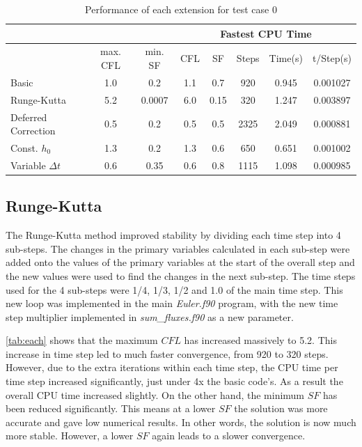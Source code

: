 \documentclass[12pt, a4paper]{article}
\begin{document}
\begin{table}[htbp]
	\centering
	\caption{Performance of each extension for test case 0}
	\begin{tabular}{|l|c|c||c|c|c|c|c|} \hline
		&       &       & \multicolumn{5}{c|}{Fastest CPU Time} \\ \hline
		& max. CFL & min. SF & CFL   & SF    & Steps & Time(s) & t/Step(s) \\ \hline
		Basic & 1.0     & 0.2   & 1.1   & 0.7   & 920   & 0.945 & 0.001027 \\ \hline
		Runge-Kutta & 5.2   & 0.0007 & 6.0     & 0.15  & 320   & 1.247 & 0.003897 \\ \hline
		Deferred Correction & 0.5   & 0.2   & 0.5   & 0.5   & 2325  & 2.049 & 0.000881 \\ \hline
		Const. $h_0$ & 1.3   & 0.2   & 1.3   & 0.6   & 650   & 0.651 & 0.001002 \\ \hline
		Variable $\Delta t$ & 0.6   & 0.35  & 0.6   & 0.8   & 1115  & 1.098 & 0.000985 \\ \hline
	\end{tabular}%
	\label{tab:each}%
\end{table}%

\subsection{Runge-Kutta}
The Runge-Kutta method improved stability by dividing each time step into 4 sub-steps. The changes in the primary variables calculated in each sub-step were added onto the values of the primary variables at the start of the overall step and the new values were used to find the changes in the next sub-step. The time steps used for the 4 sub-steps were 1/4, 1/3, 1/2 and 1.0 of the main time step. This new loop was implemented in the main \textit{Euler.f90} program, with the new time step multiplier implemented in \textit{sum\_fluxes.f90} as a new parameter.

\autoref{tab:each} shows that the maximum $CFL$ has increased massively to 5.2. This increase in time step led to much faster convergence, from 920 to 320 steps. However, due to the extra iterations within each time step, the CPU time per time step increased significantly, just under 4x the basic code's. As a result the overall CPU time increased slightly. On the other hand, the minimum $SF$ has been reduced significantly. This means at a lower $SF$ the solution was more accurate and gave low numerical results. In other words, the solution is now much more stable. However, a lower $SF$ again leads to a slower convergence.
\end{document}

